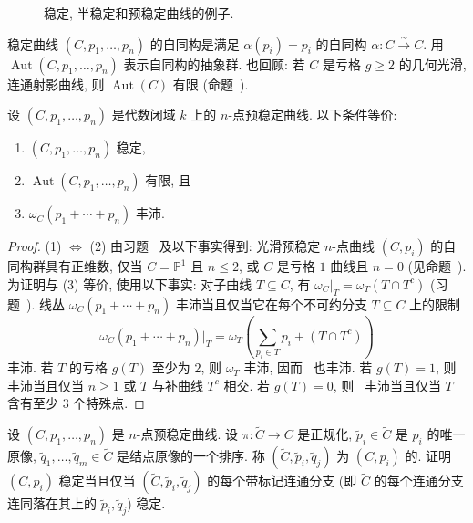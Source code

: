 \begin{figure}[H]\centering
\caption{稳定, 半稳定和预稳定曲线的例子.}\label{src:6.3.4}
\end{figure}
稳定曲线 $(C,\allowbreak p_1,\allowbreak \ldots,\allowbreak p_n)$ 的自同构是满足 $\alpha(p_i)=p_i$ 的自同构 $\alpha:C\xrightarrow{\sim}C$. 用 $\operatorname{Aut}(C,\allowbreak p_1,\allowbreak \ldots,\allowbreak p_n)$ 表示自同构的抽象群. 也回顾: 若 $C$ 是亏格 $g\geq2$ 的几何光滑, 连通射影曲线, 则 $\operatorname{Aut}(C)$ 有限 (命题~).
\begin{proposition}\label{src:6.3.5}
设 $(C,\allowbreak p_1,\allowbreak \ldots,\allowbreak p_n)$ 是代数闭域 $k$ 上的 $n$-点预稳定曲线. 以下条件等价:
\begin{enumerate}[(1)]
\item $(C,\allowbreak p_1,\allowbreak \ldots,\allowbreak p_n)$ 稳定,
\item $\operatorname{Aut}(C,\allowbreak p_1,\allowbreak \ldots,\allowbreak p_n)$ 有限, 且
\item $\omega_C(p_1+\cdots+p_n)$ 丰沛.
\end{enumerate}
\end{proposition}
\begin{proof}
(1) $\Leftrightarrow$ (2) 由习题~ 及以下事实得到: 光滑预稳定 $n$-点曲线 $(C,\allowbreak p_i)$ 的自同构群具有正维数, 仅当 $C=\mathbb P^1$ 且 $n\leq2$, 或 $C$ 是亏格 $1$ 曲线且 $n=0$ (见命题~). 为证明与 (3) 等价, 使用以下事实: 对子曲线 $T\subseteq C$, 有 $\omega_C|_T=\omega_T(T\cap T^c)$ (习题~). 线丛 $\omega_C(p_1+\cdots+p_n)$ 丰沛当且仅当它在每个不可约分支 $T\subseteq C$ 上的限制
\begin{equation}\label{src:6.3.6}
\omega_C(p_1+\cdots+p_n)|_T=\omega_T\left(\sum_{p_i\in T}p_i+(T\cap T^c)\right)
\end{equation}
丰沛. 若 $T$ 的亏格 $g(T)$ 至少为 $2$, 则 $\omega_T$ 丰沛, 因而~ 也丰沛. 若 $g(T)=1$, 则~ 丰沛当且仅当 $n\geq1$ 或 $T$ 与补曲线 $T^c$ 相交. 若 $g(T)=0$, 则~ 丰沛当且仅当 $T$ 含有至少 $3$ 个特殊点.
\end{proof}
\begin{exercise}[带标记的正规化]\label{src:6.3.7}
设 $(C,\allowbreak p_1,\allowbreak \ldots,\allowbreak p_n)$ 是 $n$-点预稳定曲线. 设 $\pi:\widetilde C\to\allowbreak C$ 是正规化, $\widetilde p_i\in\widetilde C$ 是 $p_i$ 的唯一原像, $\widetilde q_1,\allowbreak \ldots,\allowbreak \widetilde q_m\in\widetilde C$ 是结点原像的一个排序. 称 $(\widetilde C,\allowbreak \widetilde p_i,\allowbreak \widetilde q_j)$ 为 $(C,\allowbreak p_i)$ 的. 证明 $(C,\allowbreak p_i)$ 稳定当且仅当 $(\widetilde C,\allowbreak \widetilde p_i,\allowbreak \widetilde q_j)$ 的每个带标记连通分支 (即 $\widetilde C$ 的每个连通分支连同落在其上的 $\widetilde p_i,\allowbreak \widetilde q_j$) 稳定.
\end{exercise}
